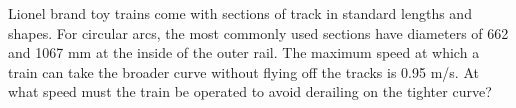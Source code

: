  Lionel brand toy trains come with sections of track in
standard lengths and shapes. For circular arcs, the most
commonly used sections have diameters of 662 and 1067 mm at
the inside of the outer rail. The maximum speed at which a
train can take the broader curve without flying off the
tracks is 0.95 m/s. At what speed must the train be operated
to avoid derailing on the tighter curve?\answercheck

